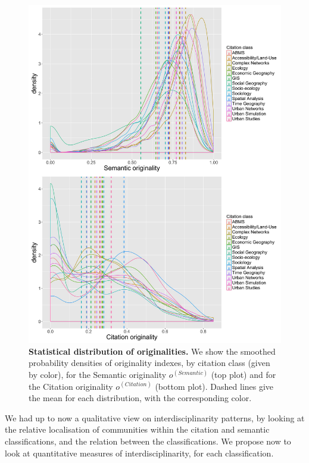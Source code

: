 \begin{figure}
\centering
\includegraphics[width=1.3\textwidth]{figures/Fig11.jpg}
\caption{\textbf{Statistical distribution of originalities.} We show the smoothed probability densities of originality indexes, by citation class (given by color), for the Semantic originality $o^{(Semantic)}$ (top plot) and for the Citation originality $o^{(Citation)}$ (bottom plot). Dashed lines give the mean for each distribution, with the corresponding color.}
\label{fig:firstorderint}
\end{figure}


We had up to now a qualitative view on interdisciplinarity patterns, by looking at the relative localisation of communities within the citation and semantic classifications, and the relation between the classifications. We propose now to look at quantitative measures of interdisciplinarity, for each classification.


